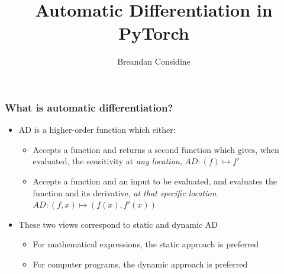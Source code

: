 \documentclass{beamer}
\title{Automatic Differentiation in PyTorch}
\author{Breandan Considine}
\begin{document}
    \frame{\titlepage}

    \begin{frame}
        \frametitle{What is automatic differentiation?}
        \begin{itemize}
            \item AD is a higher-order function which either:
            \begin{itemize}
            \item Accepts a function and returns a second function which gives, when evaluated, the sensitivity at \textit{any location}, $AD: (f) \mapsto f'$
            \item Accepts a function and an input to be evaluated, and evaluates the function and its derivative, \textit{at that specific location} $AD: (f, x) \mapsto (f(x), f'(x))$
            \end{itemize}
            \item These two views correspond to static and dynamic AD
            \begin{itemize}
            \item For mathematical expressions, the static approach is preferred
            \item For computer programs, the dynamic approach is preferred
            \end{itemize}
        \end{itemize}
    \end{frame}
\end{document}
